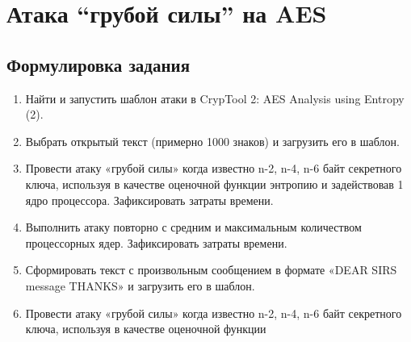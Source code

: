 \documentclass[a4paper, 14pt]{extarticle}
\begin{document}
\section{Атака \enquote{грубой силы} на AES}
\subsection{Формулировка задания}
\begin{enumerate}
    \item Найти и запустить шаблон атаки в CrypTool 2: AES Analysis using Entropy (2).
    \item  Выбрать открытый текст (примерно 1000 знаков) и загрузить его в шаблон.
    \item  Провести атаку «грубой силы» когда известно n-2, n-4, n-6 байт секретного ключа, используя в качестве оценочной функции энтропию и задействовав 1 ядро процессора. Зафиксировать затраты времени.
    \item  Выполнить атаку повторно с средним и максимальным количеством процессорных ядер. Зафиксировать затраты времени.
    \item  Сформировать текст с произвольным сообщением в формате «DEAR SIRS message THANKS» и загрузить его в шаблон. 
    \item  Провести атаку «грубой силы» когда известно n-2, n-4, n-6 байт секретного ключа, используя в качестве оценочной функции
\end{enumerate}
\end{document}
